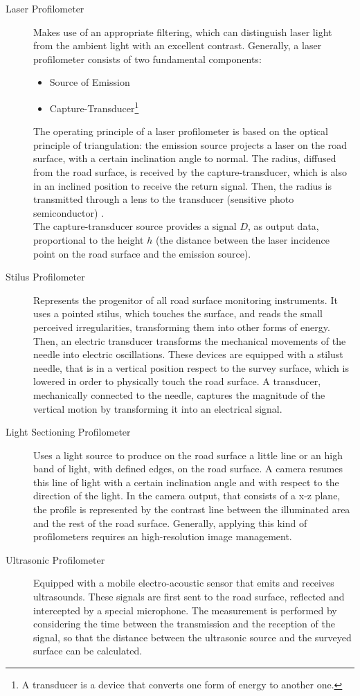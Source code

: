 \documentclass[tesi]{subfiles}
\begin{document}
\begin{description}

\item [Laser Profilometer] Makes use of an appropriate filtering, which can distinguish laser light from the ambient light with an excellent contrast. Generally, a laser profilometer consists of two fundamental components:
\begin{itemize}
\item Source of Emission
\item Capture-Transducer\footnote{A transducer is a device that converts one form of energy to another one.}
\end{itemize}
The operating principle of a laser profilometer is based on the optical principle of triangulation: the emission source projects a laser on the road surface, with a certain inclination angle to normal. The radius, diffused from the road surface, is received by the capture-transducer, which is also in an inclined position to receive the return signal. Then, the radius is transmitted through a lens to the transducer (sensitive photo semiconductor) \cite{amberg1991laser}.\\ The capture-transducer source provides a signal $D$, as output data, proportional to the height $h$ (the distance between the laser incidence point on the road surface and the emission source).
\item [Stilus Profilometer] Represents the progenitor of all road surface monitoring instruments. It uses a pointed stilus, which touches the surface, and reads the small perceived irregularities, transforming them into other forms of energy. Then, an electric transducer transforms the mechanical movements of the needle into electric oscillations. These devices are equipped with a stilust needle, that is in a vertical position respect to the survey surface, which is lowered in order to physically touch the road surface. A transducer, mechanically connected to the needle, captures the magnitude of the vertical motion by transforming it into an electrical signal.
\item [Light Sectioning Profilometer] Uses a light source to produce on the road surface a little line or an high band of light, with defined edges, on the road surface. A camera resumes this line of light with a certain inclination angle and with respect to the direction of the light. In the camera output, that consists of a x-z plane, the profile is represented by the contrast line between the illuminated area and the rest of the road surface. Generally, applying this kind of profilometers requires an high-resolution image management.
\item [Ultrasonic Profilometer] Equipped with a mobile electro-acoustic sensor that emits and receives ultrasounds. These signals are first sent to the road surface, reflected and intercepted by a special microphone. The measurement is performed by considering the time between the transmission and the reception of the signal, so that the distance between the ultrasonic source and the surveyed surface can be calculated\cite{little_book}.

\end{description}
\end{document}
